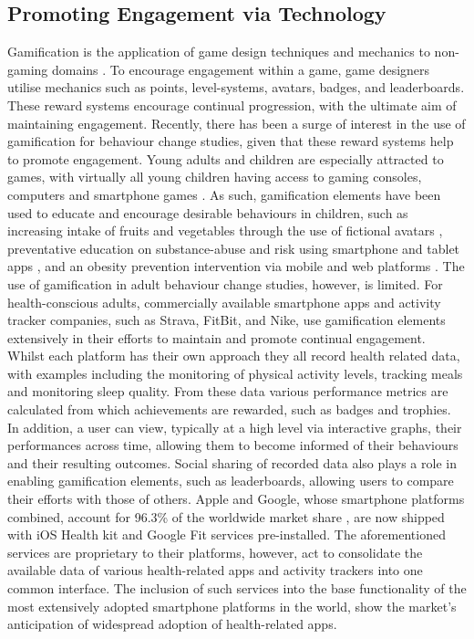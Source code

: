 \subsection{Promoting Engagement via Technology}
Gamification is the application of game design techniques and mechanics to non-gaming domains \cite{Deterding2011}. To encourage engagement within a game, game designers utilise mechanics such as points, level-systems, avatars, badges, and leaderboards. These reward systems encourage continual progression, with the ultimate aim of maintaining engagement. Recently, there has been a surge of interest in the use of gamification for behaviour change studies, given that these reward systems help to promote engagement. Young adults and children are especially attracted to games, with virtually all young children having access to gaming consoles, computers and smartphone games \cite{Schoech2013}. As such, gamification elements have been used to educate and encourage desirable behaviours in children, such as increasing intake of fruits and vegetables through the use of fictional avatars \cite{Jones2014}, preventative education on substance-abuse and risk using smartphone and tablet apps \cite{Fiellin2014}, and an obesity prevention intervention via mobile and web platforms \cite{Delisle2015}. The use of gamification in adult behaviour change studies, however, is limited.
For health-conscious adults, commercially available smartphone apps and activity tracker companies, such as Strava, FitBit, and Nike, use gamification elements extensively in their efforts to maintain and promote continual engagement. Whilst each platform has their own approach they all record health related data, with examples including the monitoring of physical activity levels, tracking meals and monitoring sleep quality. From these data various performance metrics are calculated from which achievements are rewarded, such as badges and trophies. In addition, a user can view, typically at a high level via interactive graphs, their performances across time, allowing them to become informed of their behaviours and their resulting outcomes. Social sharing of recorded data also plays a role in enabling gamification elements, such as leaderboards, allowing users to compare their efforts with those of others. Apple and Google, whose smartphone platforms combined, account for 96.3\% of the worldwide market share \cite{InternationalDataCorporation2015}, are now shipped with iOS Health kit and Google Fit services pre-installed. The aforementioned services are proprietary to their platforms, however, act to consolidate the available data of various health-related apps and activity trackers into one common interface. The inclusion of such services into the base functionality of the most extensively adopted smartphone platforms in the world, show the market’s anticipation of widespread adoption of health-related apps.
